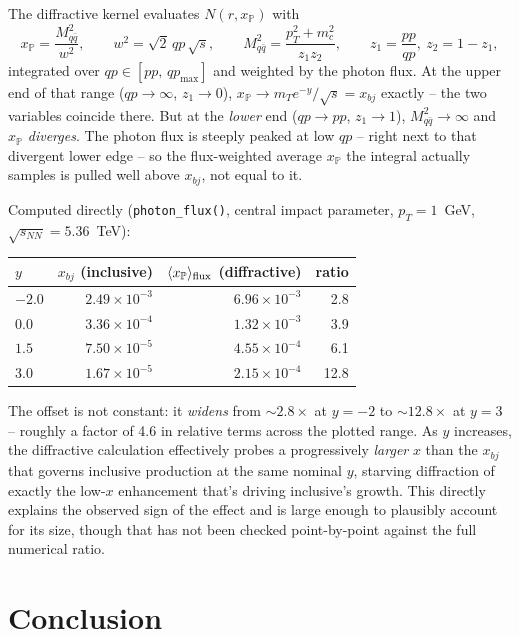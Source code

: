 \documentclass[11pt]{article}
\begin{document}
The diffractive kernel evaluates $N(r,x_{\mathbb P})$ with
\[
x_{\mathbb P} = \frac{M_{q\bar q}^2}{w^2}, \qquad
w^2 = \sqrt2\,qp\,\sqrt{s}, \qquad
M_{q\bar q}^2 = \frac{p_T^2+m_c^2}{z_1 z_2}, \qquad
z_1=\frac{pp}{qp},\ z_2=1-z_1,
\]
integrated over $qp\in[pp,\,qp_{\max}]$ and weighted by the photon flux.
At the upper end of that range ($qp\to\infty$, $z_1\to0$),
$x_{\mathbb P}\to m_T e^{-y}/\sqrt{s} = x_{bj}$ exactly -- the two
variables coincide there. But at the \emph{lower} end ($qp\to pp$,
$z_1\to1$), $M_{q\bar q}^2\to\infty$ and $x_{\mathbb P}$
\emph{diverges}. The photon flux is steeply peaked at low $qp$ -- right
next to that divergent lower edge -- so the flux-weighted average
$x_{\mathbb P}$ the integral actually samples is pulled well above
$x_{bj}$, not equal to it.

Computed directly (\texttt{photon\_flux()}, central impact parameter,
$p_T=1$~GeV, $\sqrt{s_{NN}}=5.36$~TeV):

\begin{center}
\begin{tabular}{lrrr}
\toprule
$y$ & $x_{bj}$ (inclusive) & $\langle x_{\mathbb P}\rangle_{\rm flux}$ (diffractive) & ratio \\
\midrule
$-2.0$ & $2.49\times10^{-3}$ & $6.96\times10^{-3}$ & 2.8 \\
$0.0$  & $3.36\times10^{-4}$ & $1.32\times10^{-3}$ & 3.9 \\
$1.5$  & $7.50\times10^{-5}$ & $4.55\times10^{-4}$ & 6.1 \\
$3.0$  & $1.67\times10^{-5}$ & $2.15\times10^{-4}$ & 12.8 \\
\bottomrule
\end{tabular}
\end{center}

The offset is not constant: it \emph{widens} from $\sim2.8\times$ at
$y=-2$ to $\sim12.8\times$ at $y=3$ -- roughly a factor of 4.6 in
relative terms across the plotted range. As $y$ increases, the
diffractive calculation effectively probes a progressively \emph{larger}
$x$ than the $x_{bj}$ that governs inclusive production at the same
nominal $y$, starving diffraction of exactly the low-$x$ enhancement
that's driving inclusive's growth. This directly explains the observed
sign of the effect and is large enough to plausibly account for its
size, though that has not been checked point-by-point against the
full numerical ratio.

\section{Conclusion}
\end{document}
